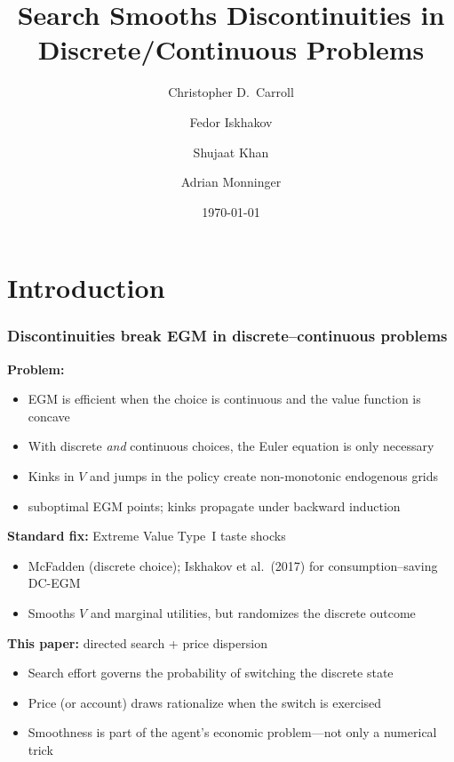\documentclass[aspectratio=169]{beamer}
\title[Search Smooths DC Problems]{Search Smooths Discontinuities in\\ Discrete/Continuous Problems}
\author[Carroll, Iskhakov, Khan, Monninger]{Christopher D.\ Carroll \and Fedor Iskhakov \and Shujaat Khan \and Adrian Monninger}
\institute[]{JHU \and Stony Brook \and IMF \and Texas A\&M}
\date{\today}
\begin{document}
\begin{frame}[plain]
	\titlepage
\end{frame}


\section{Introduction}

\begin{frame}[label = Introduction]
	\frametitle{Discontinuities break EGM in discrete--continuous problems}
	\textbf{Problem:}
	\begin{itemize}
		\item EGM is efficient when the choice is continuous and the value function is concave
		\item With discrete \emph{and} continuous choices, the Euler equation is only necessary
		\item Kinks in $V$ and jumps in the policy create non-monotonic endogenous grids
		\item[$\to$] suboptimal EGM points; kinks propagate under backward induction
	\end{itemize}
	\vspace{0.75em}
	\pause
	\textbf{Standard fix:} Extreme Value Type~I taste shocks
	\begin{itemize}
		\item McFadden (discrete choice); Iskhakov et al.\ (2017) for consumption--saving DC-EGM
		\item Smooths $V$ and marginal utilities, but randomizes the discrete outcome
	\end{itemize}
	\vspace{0.75em}
	\pause
	\textbf{This paper:} directed search + price dispersion
	\begin{itemize}
		\item Search effort governs the probability of switching the discrete state
		\item Price (or account) draws rationalize when the switch is exercised
		\item Smoothness is part of the agent's economic problem---not only a numerical trick
	\end{itemize}
\end{frame}
\end{document}
